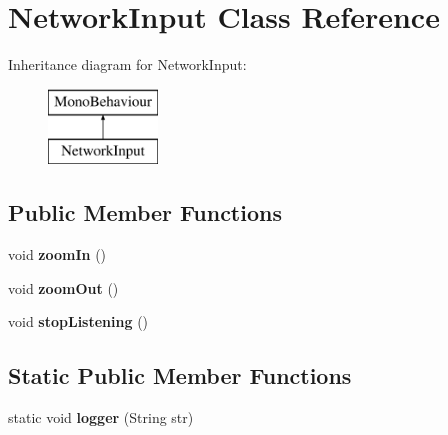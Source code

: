 \hypertarget{class_network_input}{}\section{Network\+Input Class Reference}
\label{class_network_input}
Inheritance diagram for Network\+Input\+:\begin{figure}[H]
\begin{center}
\leavevmode
\includegraphics[height=2.000000cm]{class_network_input}
\end{center}
\end{figure}
\subsection*{Public Member Functions}
\begin{DoxyCompactItemize}
\item 
\hypertarget{class_network_input_a0f9f03d6069c6fc63945afcf11fbd3db}{}void {\bfseries zoom\+In} ()\label{class_network_input_a0f9f03d6069c6fc63945afcf11fbd3db}

\item 
\hypertarget{class_network_input_a3470884a2bb1686f1befdf175ce50a07}{}void {\bfseries zoom\+Out} ()\label{class_network_input_a3470884a2bb1686f1befdf175ce50a07}

\item 
\hypertarget{class_network_input_ae14c953e88a3205806cc0b2831ab0859}{}void {\bfseries stop\+Listening} ()\label{class_network_input_ae14c953e88a3205806cc0b2831ab0859}

\end{DoxyCompactItemize}
\subsection*{Static Public Member Functions}
\begin{DoxyCompactItemize}
\item 
\hypertarget{class_network_input_a3d501d05461b6e9fd05fc7142eadeb1e}{}static void {\bfseries logger} (String str)\label{class_network_input_a3d501d05461b6e9fd05fc7142eadeb1e}

\end{DoxyCompactItemize}
